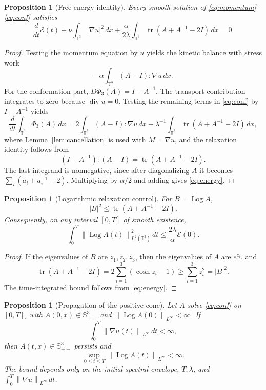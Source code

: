 \documentclass[10pt,a4paper]{amsart}
\numberwithin{equation}{section}
\newtheorem{proposition}[theorem]{Proposition}
\newcommand{\T}{\mathbb T}
\newcommand{\Id}{I}
\newcommand{\Spp}{\mathbb S_{++}}
\newcommand{\tr}{\operatorname{tr}}
\newcommand{\divv}{\operatorname{div}}
\newcommand{\Log}{\operatorname{Log}}
\newcommand{\calE}{\mathcal E}
\newcommand{\norm}[1]{\left\lVert #1\right\rVert}
\begin{document}
\begin{proposition}[Free-energy identity]
\label{prop:energy}
Every smooth solution of \eqref{eq:momentum}--\eqref{eq:conf} satisfies
\begin{equation}
  \frac{d}{dt}\calE(t)
  +\nu\int_{\T^3}|\nabla u|^2\,dx
  +\frac{\alpha}{2\lambda}
  \int_{\T^3}\tr(A+A^{-1}-2\Id)\,dx
  =0 .
  \label{eq:energy}
\end{equation}
\end{proposition}

\begin{proof}
Testing the momentum equation by \(u\) yields the kinetic balance with stress
work
\[
  -\alpha\int_{\T^3}(A-\Id):\nabla u\,dx .
\]
For the conformation part, \(D\Phi_3(A)=\Id-A^{-1}\).  The transport
contribution integrates to zero because \(\divv u=0\).  Testing the remaining
terms in \eqref{eq:conf} by \(\Id-A^{-1}\) yields
\[
  \frac{d}{dt}\int_{\T^3}\Phi_3(A)\,dx
  =
  2\int_{\T^3}(A-\Id):\nabla u\,dx
  -\lambda^{-1}
  \int_{\T^3}\tr(A+A^{-1}-2\Id)\,dx ,
\]
where Lemma~\ref{lem:cancellation} is used with \(M=\nabla u\), and the
relaxation identity follows from
\[
  (\Id-A^{-1}):(A-\Id)=\tr(A+A^{-1}-2\Id).
\]
The last integrand is nonnegative, since after diagonalizing \(A\) it becomes
\(\sum_i(a_i+a_i^{-1}-2)\).  Multiplying by \(\alpha/2\) and adding gives
\eqref{eq:energy}.
\end{proof}

\begin{proposition}[Logarithmic relaxation control]
\label{prop:log-relax}
For \(B=\Log A\),
\begin{equation}
  |B|^2\le\tr(A+A^{-1}-2\Id).
  \label{eq:pointwise-log-control}
\end{equation}
Consequently, on any interval \([0,T]\) of smooth existence,
\begin{equation}
  \int_0^T\norm{\Log A(t)}_{L^2(\T^3)}^2\,dt
  \le
  \frac{2\lambda}{\alpha}\calE(0).
  \label{eq:log-L2-time}
\end{equation}
\end{proposition}

\begin{proof}
If the eigenvalues of \(B\) are \(z_1,z_2,z_3\), then the eigenvalues of \(A\)
are \(e^{z_i}\), and
\[
  \tr(A+A^{-1}-2\Id)
  =
  2\sum_{i=1}^3(\cosh z_i-1)
  \ge \sum_{i=1}^3z_i^2=|B|^2 .
\]
The time-integrated bound follows from \eqref{eq:energy}.
\end{proof}

\begin{proposition}[Propagation of the positive cone]
\label{prop:cone}
Let \(A\) solve \eqref{eq:conf} on \([0,T]\), with
\(A(0,x)\in\Spp^3\) and \(\norm{\Log A(0)}_{L^\infty}<\infty\).  If
\[
  \int_0^T\norm{\nabla u(t)}_{L^\infty}\,dt<\infty,
\]
then \(A(t,x)\in\Spp^3\) persists and
\[
  \sup_{0\le t\le T}\norm{\Log A(t)}_{L^\infty}<\infty .
\]
The bound depends only on the initial spectral envelope, \(T,\lambda\), and
\(\int_0^T\norm{\nabla u}_{L^\infty}\,dt\).
\end{proposition}
\end{document}
